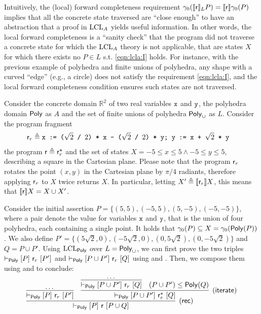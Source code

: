 Intuitively, the (local) forward completeness requirement $\gamma_0(\llbracket\mathsf{r}\rrbracket_L P) = \llbracket\mathsf{r}\rrbracket \gamma_0(P)$ implies that all the concrete state traversed are ``close enough'' to have an abstraction that a proof in $\text{LCL}_A$ yields useful information. In other words, the local forward completeness is a ``sanity check'' that the program did not traverse a concrete state for which the $\text{LCL}_A$ theory is not applicable, that are states $X$ for which there exists no $P \in L$ s.t. \eqref{eqn:lcla:I} holds. For instance, with the previous example of polyhedra and finite unions of polyhedra, any shape with a curved ``edge'' (e.g., a circle) does not satisfy the requirement \eqref{eqn:lcla:I}, and the local forward completeness condition ensures such states are not traversed. 
\begin{example}
	Consider the concrete domain $\mathbb{R}^2$ of two real variables $\texttt{x}$ and $\texttt{y}$, the polyhedra domain $\mathsf{Poly}$ as $A$ and the set of finite unions of polyhedra $\mathsf{Poly}_{\cup}$ as $L$.
	Consider the program fragment
	\begin{align*}
		\mathsf{r}_r &\triangleq \texttt{x := ($\sqrt{2}$ / $2$) * x - ($\sqrt{2}$ / $2$) * y; y := x + $\sqrt{2}$ * y}
	\end{align*}
	the program $\mathsf{r} \triangleq \mathsf{r}_r^\star$ and the set of states $X = -5 \le x \le 5 \land -5 \le y \le 5$, describing a square in the Cartesian plane. Please note that the program $\mathsf{r}_r$ rotates the point $(x, y)$ in the Cartesian plane by $\pi / 4$ radiants, therefore applying $\mathsf{r}_r$ to $X$ twice returns $X$. In particular, letting $X' \triangleq \llbracket\mathsf{r}_r\rrbracket X$, this means that $\llbracket\mathsf{r}\rrbracket X = X \cup X'$.
	
	Consider the initial assertion $P = \{ (5, 5), (-5, 5), (5, -5), (-5, -5) \}$, where a pair denote the value for variables $\texttt{x}$ and $\texttt{y}$, that is the union of four polyhedra, each containing a single point. It holds that $\gamma_0(P) \subseteq X = \gamma_0 (\mathsf{Poly}(P))$. We also define $P' = \{ (5 \sqrt{2}, 0), (- 5 \sqrt{2}, 0), (0, 5 \sqrt{2}), (0, -5 \sqrt{2}) \}$ and $Q = P \cup P'$.
	Using $\text{LCL}_{\mathsf{Poly}}$ over $L=\mathsf{Poly}_{\cup}$, we can first prove the two triples $\vdash_{\mathsf{Poly}}\nobreak[P]~\mathsf{r}_r~[P']$ and $\vdash_{\mathsf{Poly}}\nobreak[P \cup P']~\mathsf{r}_r~[Q]$ using  and . Then, we compose them using  and  to conclude:
	\[
	\infer[\lclrule{rec}]
	{\lcl{\Poly}{P}{\regr}{P \cup Q}}
	{
		\infer{\lcl{\Poly}{P}{\regr_r}{P'}}{\dots}
		&
		\infer[\lclrule{iterate}]
		{\lcl{\Poly}{P \cup P'}{\regr_r^\kstar}{Q}}
		{
			\infer{\lcl{\Poly}{P \cup P'}{\regr_r}{Q}}{\dots}
			&
			(P \cup P') \le \Poly(Q)
		}
	}
	\]
	

\end{example}

